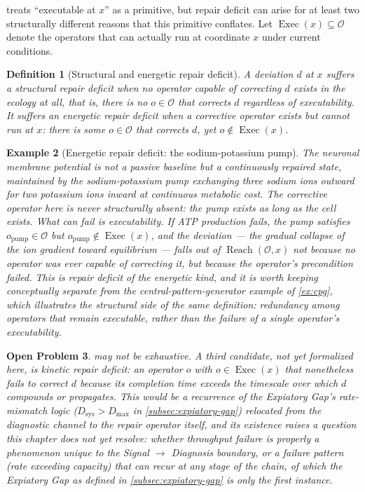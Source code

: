 \documentclass[12pt]{report}
\newtheorem{definition}{Definition}[section]
\newtheorem{example}[definition]{Example}
\newtheorem{openproblem}[definition]{Open Problem}
\begin{document}
 treats ``executable at $x$'' as a primitive, but repair
deficit can arise for at least two structurally different reasons that
this primitive conflates. Let $\operatorname{Exec}(x) \subseteq
\mathcal{O}$ denote the operators that can actually run at coordinate $x$
under current conditions.

\begin{definition}[Structural and energetic repair deficit]
\label{def:deficit-types}
A deviation $d$ at $x$ suffers a \emph{structural} repair deficit when no
operator capable of correcting $d$ exists in the ecology at all, that is,
there is no $o \in \mathcal{O}$ that corrects $d$ regardless of
executability. It suffers an \emph{energetic} repair deficit when a
corrective operator exists but cannot run at $x$: there is some $o \in
\mathcal{O}$ that corrects $d$, yet $o \notin \operatorname{Exec}(x)$.
\end{definition}

\begin{example}[Energetic repair deficit: the sodium-potassium pump]
\label{ex:pump}
The neuronal membrane potential is not a passive baseline but a
continuously repaired state, maintained by the sodium-potassium pump
exchanging three sodium ions outward for two potassium ions inward at
continuous metabolic cost. The corrective operator here is never
structurally absent: the pump exists as long as the cell exists. What can
fail is executability. If ATP production fails, the pump satisfies
$o_{\mathrm{pump}} \in \mathcal{O}$ but $o_{\mathrm{pump}} \notin
\operatorname{Exec}(x)$, and the deviation --- the gradual collapse of the
ion gradient toward equilibrium --- falls out of
$\operatorname{Reach}(\mathcal{O},x)$ not because no operator was ever
capable of correcting it, but because the operator's precondition failed.
This is repair deficit of the energetic kind, and it is worth keeping
conceptually separate from the central-pattern-generator example of
\cref{ex:cpg}, which illustrates the structural side of the same
definition: redundancy among operators that remain executable, rather
than the failure of a single operator's executability.
\end{example}

\begin{openproblem}
 may not be exhaustive. A third candidate, not yet
formalized here, is \emph{kinetic} repair deficit: an operator $o$ with $o
\in \operatorname{Exec}(x)$ that nonetheless fails to correct $d$ because
its completion time exceeds the timescale over which $d$ compounds or
propagates. This would be a recurrence of the Expiatory Gap's rate-mismatch
logic ($D_{\mathrm{sys}} > D_{\max}$ in \cref{subsec:expiatory-gap})
relocated from the diagnostic channel to the repair operator itself, and
its existence raises a question this chapter does not yet resolve: whether
throughput failure is properly a phenomenon unique to the Signal $\to$
Diagnosis boundary, or a failure pattern (rate exceeding capacity) that can
recur at any stage of the chain, of which the Expiatory Gap as defined in
\cref{subsec:expiatory-gap} is only the first instance.
\end{openproblem}
\end{document}
